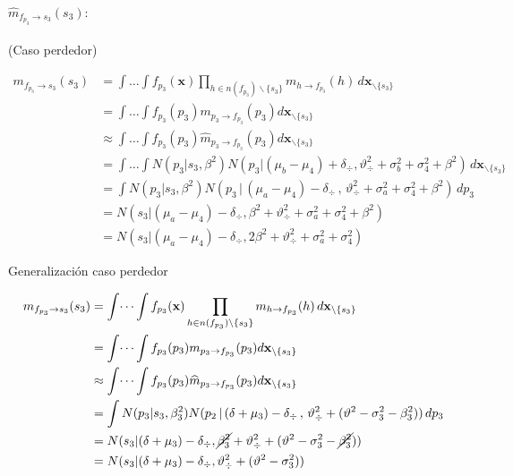 \documentclass[11pt,twoside, spanish]{report} %
\begin{document}
\paragraph{$\widehat{m}_{f_{p_3} \rightarrow s_3}(s_3):$}(Caso perdedor)

\begin{equation}
	\begin{split}
		m_{f_{p_3} \rightarrow s_3}(s_3) & = \int \dots \int f_{p_3}(\textbf{x}) \prod_{h \in n(f_{p_3}) \backslash \{s_3\} } m_{h \rightarrow f_{p_3}}(h) \, d\textbf{x}_{\backslash \{s_3\} }  \\
		&= \int \dots \int f_{p_3}(p_3)m_{p_3 \rightarrow f_{p_3}}(p_3) d\textbf{x}_{\backslash \{s_3\} }  \\
		&\approx \int \dots \int f_{p_3}(p_3)\widehat{m}_{p_3 \rightarrow f_{p_3}}(p_3) d\textbf{x}_{\backslash \{s_3\} }  \\
		&= \int \dots \int N(p_3| s_3, \beta^2)  N( p_3 |  (\mu_b - \mu_4) + \delta_{\div},\vartheta_{\div}^2 + \sigma_b^2 + \sigma_4^2 + \beta^2) \, d\textbf{x}_{\backslash \{s_3\} }\\
		& = \int N(p_3| s_3, \beta^2) N( p_3 \,|\,  (\mu_a - \mu_4) - \delta_{\div}  \,,\,\vartheta_{\div}^2 + \sigma_a^2 + \sigma_4^2 + \beta^2) \, dp_3 \\
		& = N(s_3|(\mu_a - \mu_4) - \delta_{\div}, \beta^2+\vartheta_{\div}^2 + \sigma_a^2 + \sigma_4^2+ \beta^2) \\
		& = N(s_3|(\mu_a - \mu_4) - \delta_{\div}, 2\beta^2+\vartheta_{\div}^2 + \sigma_a^2 + \sigma_4^2 )
	\end{split}
\end{equation}

Generalizaci\'on caso perdedor

\begin{equation}
	\begin{split}
		m_{f_{p_3} \rightarrow s_3}(s_3) & = \int \dots \int f_{p_3}(\textbf{x}) \prod_{h \in n(f_{p_3}) \backslash \{s_3\} } m_{h \rightarrow f_{p_3}}(h) \, d\textbf{x}_{\backslash \{s_3\} }  \\
		&= \int \dots \int f_{p_3}(p_3)m_{p_3 \rightarrow f_{p_3}}(p_3) d\textbf{x}_{\backslash \{s_3\} }  \\
		&\approx \int \dots \int f_{p_3}(p_3)\widehat{m}_{p_3 \rightarrow f_{p_3}}(p_3) d\textbf{x}_{\backslash \{s_3\} }  \\
		&= \int  N(p_3| s_3, \beta_3^2)   N( p_2 \,|\, (\delta + \mu_3) - \delta_{\div}  \,,\,\vartheta_{\div}^2 + (\vartheta^2 - \sigma_3^2 - \beta_3^2)) \, dp_3\\
		&=  N( s_3|   (\delta + \mu_3) - \delta_{\div} , \cancel{\beta_3^2}+\vartheta_{\div}^2 + (\vartheta^2 - \sigma_3^2 - \cancel{\beta_3^2})) \\
		&=  N( s_3|   (\delta + \mu_3) - \delta_{\div} , \vartheta_{\div}^2 + (\vartheta^2 - \sigma_3^2 ))
	\end{split}
\end{equation}
\end{document}
